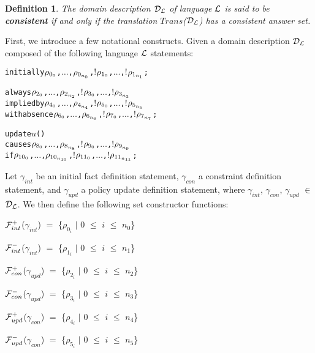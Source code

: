 \documentclass[11pt]{report}
\newtheorem{vdefinition}{Definition}[chapter]
\newenvironment{vverbatim}
{
  \begin{alltt}
}
{
    \vspace{-\baselineskip}
  \end{alltt}
}
\newenvironment{vquote}
{
  \begin{list}{}{\leftmargin 1em}\item[]
}
{
  \end{list}
}
\begin{document}
      \begin{vdefinition}
        \label{defn-langl-consi}
        The domain description ${\cal D_L}$ of language ${\cal L}$ is said to
        be {\bf consistent} if and only if the translation
        $Trans$(${\cal D_L}$) has a consistent answer set.
      \end{vdefinition}

      First, we introduce a few notational constructs. Given a domain
      description ${\cal D_L}$ composed of the following language ${\cal L}$
      statements:

      \begin{vverbatim}
  initially \(\rho\sb{0\sb{0}}\), \(\ldots\), \(\rho\sb{0\sb{n\sb{0}}}\), \(!\)\(\rho\sb{1\sb{0}}\), \(\ldots\), \(!\)\(\rho\sb{1\sb{n\sb{1}}}\);

  always \(\rho\sb{2\sb{0}}\), \(\ldots\), \(\rho\sb{2\sb{n\sb{2}}}\), \(!\)\(\rho\sb{3\sb{0}}\), \(\ldots\), \(!\)\(\rho\sb{3\sb{n\sb{3}}}\)
    implied by \(\rho\sb{4\sb{0}}\), \(\ldots\), \(\rho\sb{4\sb{n\sb{4}}}\), \(!\)\(\rho\sb{5\sb{0}}\), \(\ldots\), \(!\)\(\rho\sb{5\sb{n\sb{5}}}\)
    with absence \(\rho\sb{6\sb{0}}\), \(\ldots\), \(\rho\sb{6\sb{n\sb{6}}}\), \(!\)\(\rho\sb{7\sb{0}}\), \(\ldots\), \(!\)\(\rho\sb{7\sb{n\sb{7}}}\);

  update \(u\)()
    causes \(\rho\sb{8\sb{0}}\), \(\ldots\), \(\rho\sb{8\sb{n\sb{8}}}\), \(!\)\(\rho\sb{9\sb{0}}\), \(\ldots\), \(!\)\(\rho\sb{9\sb{n\sb{9}}}\)
    if \(\rho\sb{10\sb{0}}\), \(\ldots\), \(\rho\sb{10\sb{n\sb{10}}}\), \(!\)\(\rho\sb{11\sb{0}}\), \(\ldots\), \(!\)\(\rho\sb{11\sb{n\sb{11}}}\);
      \end{vverbatim}

      Let $\gamma_{int}$ be an initial fact definition statement,
      $\gamma_{con}$ a constraint definition statement, and $\gamma_{upd}$
      a policy update definition statement, where $\gamma_{int}$,
      $\gamma_{con}$, $\gamma_{upd}$ $\in$ ${\cal D}_{\cal L}$. We then define
      the following set constructor functions:

      \begin{vquote}
        ${\cal F}^{+}_{int}$($\gamma_{int}$) $=$
          \{$\rho_{0_i}$ $\mid$ $0$ $\leq$ $i$ $\leq$ $n_0$\}

        ${\cal F}^{-}_{int}$($\gamma_{int}$) $=$
          \{$\rho_{1_i}$ $\mid$ $0$ $\leq$ $i$ $\leq$ $n_1$\}

        ${\cal F}^{+}_{con}$($\gamma_{upd}$) $=$
          \{$\rho_{2_i}$ $\mid$ $0$ $\leq$ $i$ $\leq$ $n_2$\}

        ${\cal F}^{-}_{con}$($\gamma_{upd}$) $=$
          \{$\rho_{3_i}$ $\mid$ $0$ $\leq$ $i$ $\leq$ $n_3$\}

        ${\cal F}^{+}_{upd}$($\gamma_{con}$) $=$
          \{$\rho_{4_i}$ $\mid$ $0$ $\leq$ $i$ $\leq$ $n_4$\}

        ${\cal F}^{-}_{upd}$($\gamma_{con}$) $=$
          \{$\rho_{5_i}$ $\mid$ $0$ $\leq$ $i$ $\leq$ $n_5$\}
      \end{vquote}
\end{document}
